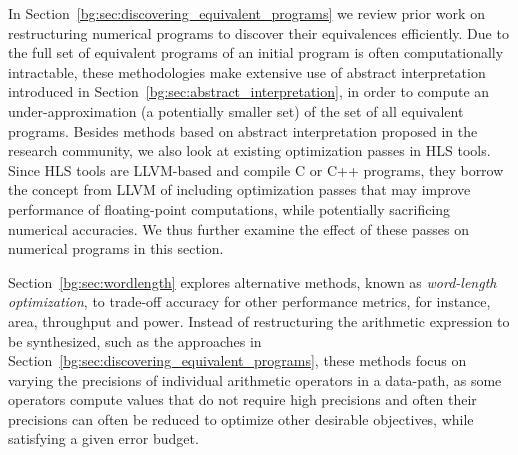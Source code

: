In Section~\ref{bg:sec:discovering_equivalent_programs} we review prior work on
restructuring numerical programs to discover their equivalences efficiently.
Due to the full set of equivalent programs of an initial program is often
computationally intractable, these methodologies make extensive use of abstract
interpretation introduced in Section~\ref{bg:sec:abstract_interpretation}, in
order to compute an under-approximation (a potentially smaller set) of the set
of all equivalent programs.  Besides methods based on abstract interpretation
proposed in the research community, we also look at existing optimization
passes in HLS tools.  Since HLS tools are LLVM-based and compile C or C++
programs, they borrow the concept from LLVM of including optimization passes
that may improve performance of floating-point computations, while potentially
sacrificing numerical accuracies.  We thus further examine the effect of these
passes on numerical programs in this section.

Section~\ref{bg:sec:wordlength} explores alternative methods, known as
\emph{word-length optimization}, to trade-off accuracy for other performance
metrics, for instance, area, throughput and power.  Instead of restructuring
the arithmetic expression to be synthesized, such as the approaches in
Section~\ref{bg:sec:discovering_equivalent_programs}, these methods focus on
varying the precisions of individual arithmetic operators in a data-path, as
some operators compute values that do not require high precisions and often
their precisions can often be reduced to optimize other desirable objectives,
while satisfying a given error budget.
